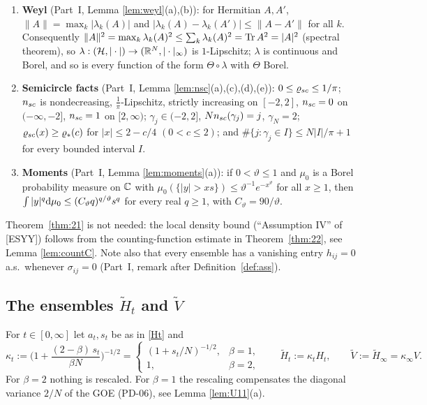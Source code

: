 \begin{enumerate}[leftmargin=2.4em,itemsep=2pt,label=(RA\arabic*)]
\item \textbf{Weyl} (Part~I, Lemma \ref{lem:weyl}(a),(b)): for Hermitian $A,A'$, $\|A\|=\max_k|\lambda_k(A)|$ and $|\lambda_k(A)-\lambda_k(A')|\le\|A-A'\|$ for all $k$.
Consequently $\|A\|^2=\max_k\lambda_k(A)^2\le\sum_k\lambda_k(A)^2=\operatorname{Tr} A^2=|A|^2$ (spectral theorem), so $\lambda:(\mathcal{H},|\cdot|)\to(\mathbb{R}^N,|\cdot|_\infty)$ is $1$-Lipschitz; $\lambda$ is continuous and Borel, and so is every function of the form $\Theta\circ\lambda$ with $\Theta$ Borel.
\item \textbf{Semicircle facts} (Part~I, Lemma \ref{lem:nsc}(a),(c),(d),(e)): $0\le\varrho_{sc}\le1/\pi$; $n_{sc}$ is nondecreasing, $\frac1\pi$-Lipschitz, strictly increasing on $[-2,2]$, $n_{sc}=0$ on $(-\infty,-2]$, $n_{sc}=1$ on $[2,\infty)$;
$\gamma_j\in(-2,2]$, $Nn_{sc}(\gamma_j)=j$, $\gamma_N=2$; $\varrho_{sc}(x)\ge\varrho_*(c)$ for $|x|\le2-c/4$ $(0<c\le2)$; and $\#\{j:\gamma_j\in I\}\le N|I|/\pi+1$ for every bounded interval $I$.
\item \textbf{Moments} (Part~I, Lemma \ref{lem:moments}(a)): if $0<\vartheta\le1$ and $\mu_0$ is a Borel probability measure on $\mathbb{C}$ with $\mu_0(\{|y|>xs\})\le\vartheta^{-1}e^{-x^\vartheta}$ for all $x\ge1$, then $\int|y|^q\mathrm{d}\mu_0\le(C_\vartheta q)^{q/\vartheta}s^q$ for every real $q\ge1$, with $C_\vartheta=90/\vartheta$.
\end{enumerate}
Theorem~\ref{thm:21} is not needed: the local density bound (``Assumption IV'' of [ESYY]) follows from the counting-function estimate in Theorem~\ref{thm:22}, see Lemma \ref{lem:countC}.
Note also that every ensemble has a vanishing entry $h_{ij}=0$ a.s.\ whenever $\sigma_{ij}=0$ (Part~I, remark after Definition~\ref{def:ass}).

\subsection{The ensembles $\widetilde H_t$ and $\widetilde V$}

For $t\in[0,\infty]$ let $a_t,s_t$ be as in \eqref{Ht} and
\begin{equation}\label{tildeH}
\kappa_t:=\Big(1+\frac{(2-\beta)\,s_t}{\beta N}\Big)^{-1/2}=\begin{cases}(1+s_t/N)^{-1/2},&\beta=1,\\ 1,&\beta=2,\end{cases}\qquad \widetilde H_t:=\kappa_tH_t,\qquad \widetilde V:=\widetilde H_\infty=\kappa_\infty V .
\end{equation}
For $\beta=2$ nothing is rescaled. For $\beta=1$ the rescaling compensates the diagonal variance $2/N$ of the GOE (PD-06), see Lemma \ref{lem:U11}(a).

